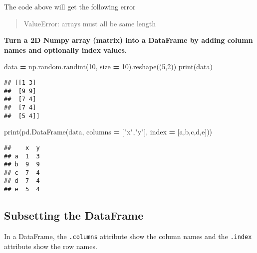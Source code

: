 \documentclass[
]{book}
\newenvironment{Shaded}{\begin{snugshade}}{\end{snugshade}}
\newcommand{\BuiltInTok}[1]{#1}
\newcommand{\DecValTok}[1]{\textcolor[rgb]{0.00,0.00,0.81}{#1}}
\newcommand{\NormalTok}[1]{#1}
\newcommand{\OperatorTok}[1]{\textcolor[rgb]{0.81,0.36,0.00}{\textbf{#1}}}
\newcommand{\StringTok}[1]{\textcolor[rgb]{0.31,0.60,0.02}{#1}}
\begin{document}
The code above will get the following error

\begin{quote}
ValueError: arrays must all be same length
\end{quote}

\textbf{Turn a 2D Numpy array (matrix) into a DataFrame by adding column names and optionally
index values.}

\begin{Shaded}
\begin{Highlighting}[]
\NormalTok{data }\OperatorTok{=}\NormalTok{ np.random.randint(}\DecValTok{10}\NormalTok{, size }\OperatorTok{=} \DecValTok{10}\NormalTok{).reshape((}\DecValTok{5}\NormalTok{,}\DecValTok{2}\NormalTok{))}
\BuiltInTok{print}\NormalTok{(data)}
\end{Highlighting}
\end{Shaded}

\begin{verbatim}
## [[1 3]
##  [9 9]
##  [7 4]
##  [7 4]
##  [5 4]]
\end{verbatim}

\begin{Shaded}
\begin{Highlighting}[]
\BuiltInTok{print}\NormalTok{(pd.DataFrame(data, columns }\OperatorTok{=}\NormalTok{ [}\StringTok{"x"}\NormalTok{,}\StringTok{"y"}\NormalTok{], index }\OperatorTok{=}\NormalTok{ [}\StringTok{\textquotesingle{}a\textquotesingle{}}\NormalTok{,}\StringTok{\textquotesingle{}b\textquotesingle{}}\NormalTok{,}\StringTok{\textquotesingle{}c\textquotesingle{}}\NormalTok{,}\StringTok{\textquotesingle{}d\textquotesingle{}}\NormalTok{,}\StringTok{\textquotesingle{}e\textquotesingle{}}\NormalTok{]))}
\end{Highlighting}
\end{Shaded}

\begin{verbatim}
##    x  y
## a  1  3
## b  9  9
## c  7  4
## d  7  4
## e  5  4
\end{verbatim}

\hypertarget{subsetting-the-dataframe}{%
\subsection{Subsetting the DataFrame}\label{subsetting-the-dataframe}}

In a DataFrame, the \texttt{.columns} attribute show the column names and the \texttt{.index} attribute
show the row names.
\end{document}
